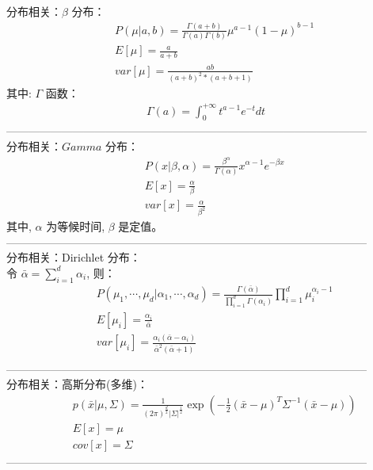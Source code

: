\documentclass{article}
\begin{document}
\noindent 分布相关：$\beta$ 分布：\\
\begin{eqnarray*}
&&P(\mu|a,b) = \frac{\Gamma(a+b)}{\Gamma(a)\Gamma(b)}\mu^{a-1}(1-\mu)^{b-1}\\
&&E[\mu] = \frac{a}{a+b}\\
&&var[\mu] = \frac{ab}{(a+b)^{2}*(a+b+1)}
\end{eqnarray*}
其中: $\Gamma$ 函数：
\begin{eqnarray*}
\Gamma(a) = \int_{0}^{+\infty}t^{a-1}e^{-t}dt
\end{eqnarray*}
--------------------------------------------------------------------------------------------------\\

\noindent 分布相关：$Gamma$ 分布：\\
\begin{eqnarray*}
&&P(x|\beta, \alpha)=\frac{\beta^{\alpha}}{\Gamma(\alpha)}x^{\alpha-1}e^{-\beta x}\\
&&E[x] = \frac{\alpha}{\beta}\\
&&var[x] = \frac{\alpha}{\beta^{2}}
\end{eqnarray*}
其中, $\alpha$ 为等候时间, $\beta$ 是定值。	\\
--------------------------------------------------------------------------------------------------\\

\noindent 分布相关：Dirichlet 分布：\\
令 $\bar{\alpha}=\sum_{i=1}^{d}\alpha_{i}$, 则：
\begin{eqnarray*}
&&P(\mu_{1},\cdots, \mu_{d}|\alpha_{1},\cdots, \alpha_{d}) = \frac{\Gamma(\bar{\alpha})}{\prod_{i=1}^{d}\Gamma(\alpha_{i})}\prod_{i=1}^{d}\mu_{i}^{\alpha_{i}-1}\\
&&E[\mu_{i}] = \frac{\alpha_{i}}{\bar{\alpha}}\\
&&var[\mu_{i}] = \frac{\alpha_{i}(\bar{\alpha}-\alpha_{i})}{\bar{\alpha}^{2}(\bar{\alpha} + 1)}\\
\end{eqnarray*}
--------------------------------------------------------------------------------------------------\\

\noindent 分布相关：高斯分布(多维)：\\
\begin{eqnarray*}
&&p(\bar{x}|\mu, \Sigma) = \frac{1}{(2\pi)^{\frac{d}{2}}|\Sigma|^{\frac{1}{2}}}\exp{(-\frac{1}{2}(\bar{x}-\mu)^{T}\Sigma^{-1}(\bar{x}-\mu))}\\
&&E[x]=\mu\\
&&cov[x]=\Sigma
\end{eqnarray*}
--------------------------------------------------------------------------------------------------\\
\end{document}
